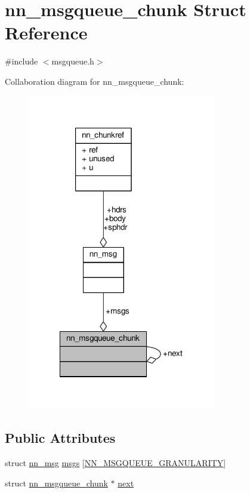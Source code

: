 \hypertarget{structnn__msgqueue__chunk}{}\section{nn\+\_\+msgqueue\+\_\+chunk Struct Reference}
\label{structnn__msgqueue__chunk}


{\ttfamily \#include $<$msgqueue.\+h$>$}



Collaboration diagram for nn\+\_\+msgqueue\+\_\+chunk\+:\nopagebreak
\begin{figure}[H]
\begin{center}
\leavevmode
\includegraphics[width=234pt]{structnn__msgqueue__chunk__coll__graph}
\end{center}
\end{figure}
\subsection*{Public Attributes}
\begin{DoxyCompactItemize}
\item 
struct \hyperlink{structnn__msg}{nn\+\_\+msg} \hyperlink{structnn__msgqueue__chunk_a69bcf939f933f7711a47618ecb936e2b}{msgs} \mbox{[}\hyperlink{msgqueue_8h_a13fd89d03f816db3fdc589dfb3c706ff}{N\+N\+\_\+\+M\+S\+G\+Q\+U\+E\+U\+E\+\_\+\+G\+R\+A\+N\+U\+L\+A\+R\+I\+TY}\mbox{]}
\item 
struct \hyperlink{structnn__msgqueue__chunk}{nn\+\_\+msgqueue\+\_\+chunk} $\ast$ \hyperlink{structnn__msgqueue__chunk_aa539574be0f7c15d30f2c0920b3586a1}{next}
\end{DoxyCompactItemize}


